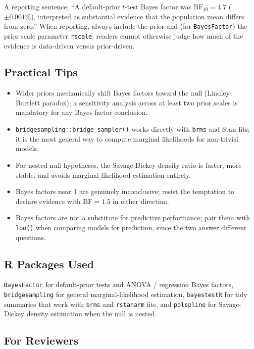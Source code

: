 \documentclass[
]{article}
\providecommand{\tightlist}{%
  \setlength{\itemsep}{0pt}\setlength{\parskip}{0pt}}
\begin{document}
A reporting sentence: ``A default-prior \(t\)-test Bayes factor was
\(\mathrm{BF}_{10} = 4.7\) (\(\pm 0.001 \%\)), interpreted as
substantial evidence that the population mean differs from zero.'' When
reporting, always include the prior and (for \texttt{BayesFactor}) the
prior scale parameter \texttt{rscale}; readers cannot otherwise judge
how much of the evidence is data-driven versus prior-driven.

\subsection{Practical Tips}\label{practical-tips}

\begin{itemize}
\tightlist
\item
  Wider priors mechanically shift Bayes factors toward the null
  (Lindley--Bartlett paradox); a sensitivity analysis across at least
  two prior scales is mandatory for any Bayes-factor conclusion.
\item
  \texttt{bridgesampling::bridge\_sampler()} works directly with
  \texttt{brms} and Stan fits; it is the most general way to compute
  marginal likelihoods for non-trivial models.
\item
  For nested null hypotheses, the Savage-Dickey density ratio is faster,
  more stable, and avoids marginal-likelihood estimation entirely.
\item
  Bayes factors near 1 are genuinely inconclusive; resist the temptation
  to declare evidence with \(\mathrm{BF} = 1.5\) in either direction.
\item
  Bayes factors are not a substitute for predictive performance; pair
  them with \texttt{loo()} when comparing models for prediction, since
  the two answer different questions.
\end{itemize}

\subsection{R Packages Used}\label{r-packages-used}

\texttt{BayesFactor} for default-prior tests and ANOVA / regression
Bayes factors, \texttt{bridgesampling} for general marginal-likelihood
estimation, \texttt{bayestestR} for tidy summaries that work with
\texttt{brms} and \texttt{rstanarm} fits, and \texttt{polspline} for
Savage-Dickey density estimation when the null is nested.

\subsection{For Reviewers}\label{for-reviewers}
\end{document}

